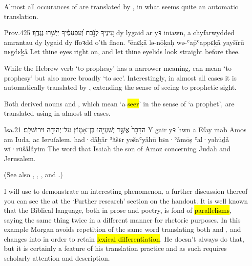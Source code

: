 Almost all occurances of  are translated by , in what seems quite an automatic translation.

\begin{example}{Prov.}{4}{25}{}{}
	\quoling
	{עֵ֭ינֶיךָ לְנֹ֣כַח  וְ֝עַפְעַפֶּ֗יךָ יַיְשִׁ֥רוּ נֶגְדֶּֽךָ׃}
	{ dy lygaid ar yꝛ iniawn, a chyfarwydded amrantau dy lygaid dy ffoꝛdd o’th flaen.}
	{ʿēnɛḵå̄ lə-nōḵaḥ  wə-ʿap̄ʿappɛḵå̄ yayšīrū nɛḡdɛḵå̄}
	{Let thine eyes  right on, and let thine eyelids look straight before thee.}
\end{example}



\label{sight:ḥå̄zå̄}

\begin{paper}
	{\click} While the Hebrew verb  ‘to prophesy’ has a narrower meaning,  can mean ‘to prophesy’ but also more broadly ‘to see’. Interestingly, in almost all cases it is automatically translated by , extending the sense of seeing to prophetic sight.

	Both derived nouns  and , which mean ‘a \hl{seer}’ in the sense of ‘a prophet’, are translated using  in almost all cases.
\end{paper}

\begin{example}{Isa.}{2}{1}{}{}
	\quoling
	{הַדָּבָר֙ אֲשֶׁ֣ר 	יְשַֽׁעְיָ֖הוּ בֶּן־אָמ֑וֹץ עַל־יְהוּדָ֖ה וִירוּשָׁלִָֽם׃}
	{Y gair yꝛ hwn a  Eſay mab Amos am Iuda, ac Ieruſalem.}
	{had·då̄ḇå̄r ʾăšɛr  yəšaʿyå̄hū bɛn·ʾå̄mōṣ ʿal·yəhūḏå̄ wī·rūšå̄lå̄yim}
	{The word that Isaiah the son of Amoz  concerning Judah and Jerusalem.}
\end{example}
(See also , , ,  and .)

\begin{paper}
	I will use  to demonstrate an interesting phenomenon, a further discussion thereof you can see the at the ‘Further research’ section on the handout. It is well known that the Biblical language, both in prose and poetry, is fond of \hl{parallelisms}, saying the same thing twice in a different manner for rhetoric purposes. In this example Morgan avoids repetition of the same word translating both  and , and changes  into  in order to retain \hl{lexical differentiation}. He doesn’t always do that, but it is certainly a feature of his translation practice and as such requires scholarly attention and description.
\end{paper}

